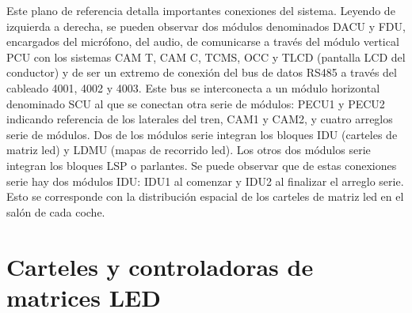 Este plano de referencia detalla importantes conexiones del sistema. Leyendo de izquierda a derecha, se pueden observar dos módulos denominados DACU y FDU, encargados del micrófono, del audio, de comunicarse a través del módulo vertical PCU  con los sistemas CAM T, CAM C, TCMS, OCC y TLCD (pantalla LCD del conductor) y de ser un extremo de conexión del bus de datos RS485 a través del cableado 4001, 4002 y 4003. Este bus se interconecta a un módulo horizontal denominado SCU al que se conectan otra serie de módulos: PECU1 y PECU2 indicando referencia de los laterales del tren, CAM1 y CAM2, y cuatro arreglos serie de módulos. Dos de los módulos serie integran los bloques IDU (carteles de matriz led) y LDMU (mapas de recorrido led). Los otros dos módulos serie integran los bloques LSP o parlantes. Se puede observar que de estas conexiones serie hay dos módulos IDU: IDU1 al comenzar y IDU2 al finalizar el arreglo serie. Esto se corresponde con la distribución espacial de los carteles de matriz led en el salón de cada coche.\\



\section{Carteles y controladoras de matrices LED}

